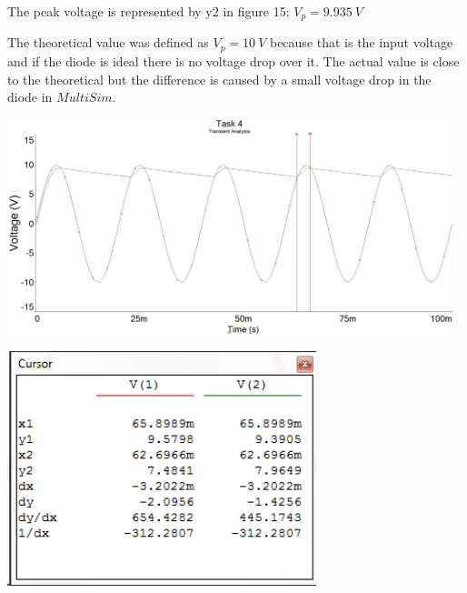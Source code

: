 \documentclass[11pt,a4paper]{article}
\begin{document}
\begin{enumerate}
    \vspace{2em}
        
    The peak voltage is represented by y2 in figure 15: $V_p = 9.935 \ V$ 
    
    The theoretical value was defined as $V_p = 10 \ V$ because that is the input voltage and if the diode is ideal there is no voltage drop over it. The actual value is close to the theoretical but the difference is caused by a small voltage drop in the diode in $MultiSim$. \\
    
    \begin{minipage}{\linewidth}
    	\centering
        \includegraphics[width=13cm]{4_3.jpg}
    \end{minipage}
    
    \begin{minipage}{\linewidth}
    	\centering
        \includegraphics[width=9cm]{table_4_2.png}
    \end{minipage}
    
    \vspace{2em}
    

\end{enumerate}
\end{document}
